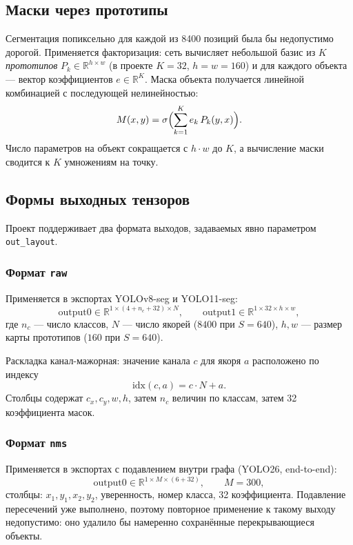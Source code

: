 \documentclass[11pt,a4paper]{article}
\theoremstyle{definition}
\theoremstyle{remark}
\begin{document}
\subsection{Маски через прототипы}

Сегментация попиксельно для каждой из 8400 позиций была бы недопустимо
дорогой. Применяется факторизация: сеть вычисляет небольшой базис из $K$
\emph{прототипов} $P_k \in \mathbb{R}^{h \times w}$ (в проекте $K=32$,
$h=w=160$) и для каждого объекта --- вектор коэффициентов $e \in
\mathbb{R}^{K}$. Маска объекта получается линейной комбинацией с последующей
нелинейностью:
\[
  M(x,y) = \sigma\Bigl(\sum_{k=1}^{K} e_k \, P_k(y,x)\Bigr).
\]
Число параметров на объект сокращается с $h \cdot w$ до $K$, а вычисление
маски сводится к $K$ умножениям на точку.

\subsection{Формы выходных тензоров}

Проект поддерживает два формата выходов, задаваемых явно параметром
\texttt{out\_layout}.

\subsubsection{Формат \texttt{raw}}

Применяется в экспортах YOLOv8-seg и YOLO11-seg:
\[
  \text{output0} \in \mathbb{R}^{1 \times (4 + n_c + 32) \times N},
  \qquad
  \text{output1} \in \mathbb{R}^{1 \times 32 \times h \times w},
\]
где $n_c$ --- число классов, $N$ --- число якорей ($8400$ при $S=640$),
$h, w$ --- размер карты прототипов ($160$ при $S=640$).

Раскладка канал-мажорная: значение канала $c$ для якоря $a$ расположено по
индексу
\[
  \mathrm{idx}(c,a) = c \cdot N + a .
\]
Столбцы содержат $c_x, c_y, w, h$, затем $n_c$ величин по классам, затем 32
коэффициента масок.

\subsubsection{Формат \texttt{nms}}

Применяется в экспортах с подавлением внутри графа (YOLO26, end-to-end):
\[
  \text{output0} \in \mathbb{R}^{1 \times M \times (6 + 32)}, \qquad M = 300,
\]
столбцы: $x_1, y_1, x_2, y_2$, уверенность, номер класса, 32 коэффициента.
Подавление пересечений уже выполнено, поэтому повторное применение к такому
выходу недопустимо: оно удалило бы намеренно сохранённые перекрывающиеся
объекты.
\end{document}
